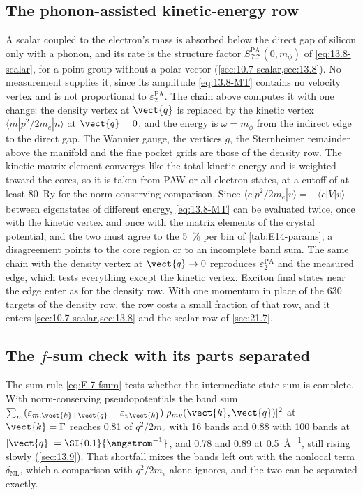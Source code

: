 \subsection{The phonon-assisted kinetic-energy row}

A scalar coupled to the electron's mass is absorbed below the direct gap of silicon only with a phonon, and its rate is the structure factor $S^{\mathrm{PA}}_{\mathcal{T}\mathcal{T}}(0,m_\phi)$ of \cref{eq:13.8-scalar}, for a point group without a polar vector (\cref{sec:10.7-scalar,sec:13.8}). No measurement supplies it, since its amplitude \cref{eq:13.8-MT} contains no velocity vertex and is not proportional to $\varepsilon_2^{\mathrm{PA}}$. The chain above computes it with one change: the density vertex at $\vect{q}$ is replaced by the kinetic vertex $\langle m|p^2/2m_e|n\rangle$ at $\vect{q} = 0$, and the energy is $\omega = m_\phi$ from the indirect edge to the direct gap. The Wannier gauge, the vertices $g$, the Sternheimer remainder above the manifold and the fine pocket grids are those of the density row. The kinetic matrix element converges like the total kinetic energy and is weighted toward the cores, so it is taken from PAW or all-electron states, at a cutoff of at least \SI{80}{Ry} for the norm-conserving comparison. Since $\langle c|p^2/2m_e|v\rangle = -\langle c|V|v\rangle$ between eigenstates of different energy, \cref{eq:13.8-MT} can be evaluated twice, once with the kinetic vertex and once with the matrix elements of the crystal potential, and the two must agree to the \SI{5}{\percent} per bin of \cref{tab:E14-params}; a disagreement points to the core region or to an incomplete band sum. The same chain with the density vertex at $\vect{q}\to0$ reproduces $\varepsilon_2^{\mathrm{PA}}$ and the measured edge, which tests everything except the kinetic vertex. Exciton final states near the edge enter as for the density row. With one momentum in place of the 630 targets of the density row, the row costs a small fraction of that row, and it enters \cref{sec:10.7-scalar,sec:13.8} and the scalar row of \cref{sec:21.7}.

\subsection{The \texorpdfstring{$f$}{f}-sum check with its parts separated}

The sum rule \cref{eq:E.7-fsum} tests whether the intermediate-state sum is complete. With norm-conserving pseudopotentials the band sum $\sum_m(\varepsilon_{m,\vect{k}+\vect{q}} - \varepsilon_{v\vect{k}})|\rho_{mv}(\vect{k},\vect{q})|^2$ at $\vect{k} = \mathrm{\Gamma}$ reaches 0.81 of $q^2/2m_e$ with 16 bands and 0.88 with 100 bands at $|\vect{q}| = \SI{0.1}{\angstrom^{-1}}$, and 0.78 and 0.89 at \SI{0.5}{\angstrom^{-1}}, still rising slowly (\cref{sec:13.9}). That shortfall mixes the bands left out with the nonlocal term $\delta_{\mathrm{NL}}$, which a comparison with $q^2/2m_e$ alone ignores, and the two can be separated exactly.

